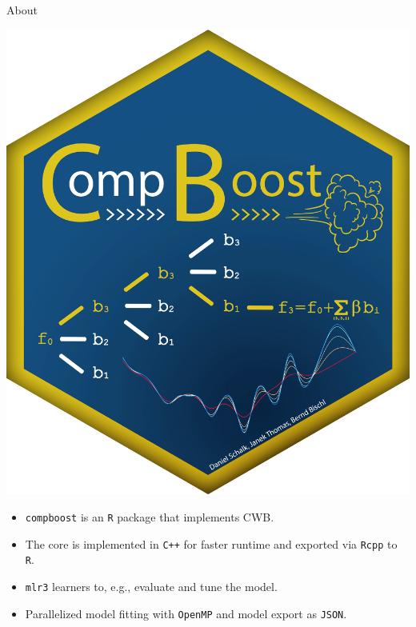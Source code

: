 \documentclass[t,10pt]{beamer}
\begin{document}
\begin{frame}{About}
  \begin{minipage}[t]{0.18\textwidth}
    \includegraphics[width=\linewidth]{figures/fig-compboost-logo.png}
  \end{minipage}
  \begin{minipage}{0.8\textwidth}
  \begin{itemize}
    \item
      \texttt{compboost} is an \texttt{R} package that implements CWB.
    \item
      The core is implemented in \texttt{C++} for faster runtime and exported via \texttt{Rcpp} to \texttt{R}.
    \item
      \texttt{mlr3} learners to, e.g., evaluate and tune the model.
    \item
      Parallelized model fitting with \texttt{OpenMP} and model export as \texttt{JSON}.
  \end{itemize}
  \end{minipage}
\end{frame}
\end{document}
